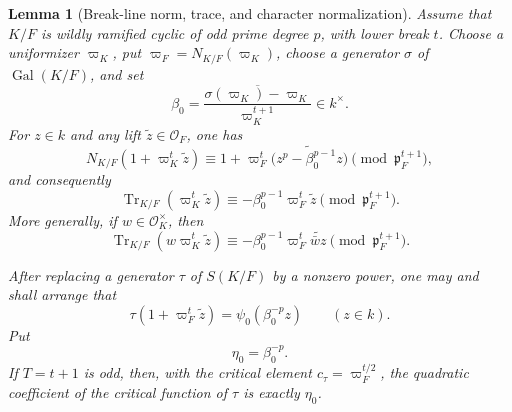 \documentclass[11pt]{amsart}
\newtheorem{lemma}[theorem]{Lemma}
\theoremstyle{definition}
\theoremstyle{remark}
\newcommand{\cO}{\mathcal O}
\newcommand{\p}{\mathfrak p}
\newcommand{\Tr}{\operatorname{Tr}}
\newcommand{\Gal}{\operatorname{Gal}}
\begin{document}
\begin{lemma}[Break-line norm, trace, and character normalization]
\label{lem:odd-break-line-normalization}
Assume that $K/F$ is wildly ramified cyclic of odd prime degree $p$,
with lower break $t$.  Choose a uniformizer $\varpi_K$, put
$\varpi_F=N_{K/F}(\varpi_K)$, choose a generator $\sigma$ of
$\Gal(K/F)$, and set
\begin{equation}\label{eq:odd-ramification-coordinate}
 \beta_0=
 \overline{\frac{\sigma(\varpi_K)-\varpi_K}
                  {\varpi_K^{t+1}}}\in k^\times.
\end{equation}
For $z\in k$ and any lift $\widetilde z\in\cO_F$, one has
\begin{equation}\label{eq:odd-critical-norm-polynomial}
 N_{K/F}(1+\varpi_K^t\widetilde z)
 \equiv
 1+\varpi_F^t\widetilde{\bigl(z^p-\beta_0^{p-1}z\bigr)}
 \pmod{\p_F^{t+1}},
\end{equation}
and consequently
\begin{equation}\label{eq:odd-break-trace-coordinate}
 \Tr_{K/F}(\varpi_K^t\widetilde z)
 \equiv
 -\beta_0^{p-1}\varpi_F^t\widetilde z
 \pmod{\p_F^{t+1}}.
\end{equation}
More generally, if $w\in\cO_K^\times$, then
\begin{equation}\label{eq:odd-break-trace-unit}
 \Tr_{K/F}(w\varpi_K^t\widetilde z)
 \equiv
 -\beta_0^{p-1}\varpi_F^t
  \widetilde{\bar w z}
 \pmod{\p_F^{t+1}}.
\end{equation}

After replacing a generator $\tau$ of $S(K/F)$ by a nonzero power,
one may and shall arrange that
\begin{equation}\label{eq:odd-tau-last-layer}
 \tau(1+\varpi_F^t\widetilde z)
   =\psi_0(\beta_0^{-p}z)\qquad(z\in k).
\end{equation}
Put
\begin{equation}\label{eq:odd-eta0-normalization}
 \eta_0=\beta_0^{-p}.
\end{equation}
If $T=t+1$ is odd, then, with the critical element
$c_\tau=\varpi_F^{t/2}$, the quadratic coefficient of the critical
function of $\tau$ is exactly $\eta_0$.
\end{lemma}
\end{document}
